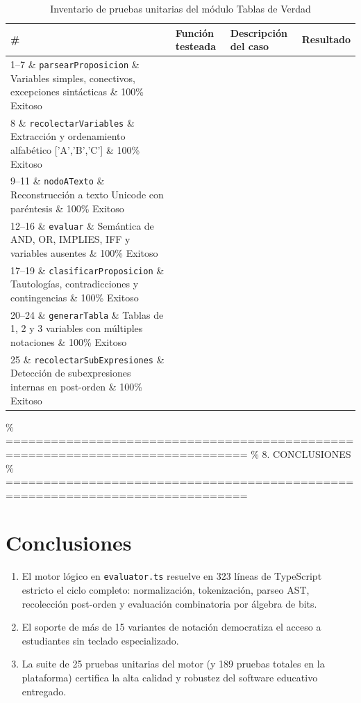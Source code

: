 \documentclass[11pt,a4paper]{article}
\begin{document}
\begin{table}[H]
\centering
\caption{Inventario de pruebas unitarias del módulo Tablas de Verdad}
\label{tab:inventario_tests}
\small
\begin{tabularx}{\textwidth}{llXl}
\toprule
\textbf{\#} & \textbf{Función testeada} & \textbf{Descripción del caso} & \textbf{Resultado} \\
\midrule
1--7 \& \texttt{parsearProposicion} \& Variables simples, conectivos, excepciones sintácticas \& 100\% Exitoso \\
8 \& \texttt{recolectarVariables} \& Extracción y ordenamiento alfabético ['A','B','C'] \& 100\% Exitoso \\
9--11 \& \texttt{nodoATexto} \& Reconstrucción a texto Unicode con paréntesis \& 100\% Exitoso \\
12--16 \& \texttt{evaluar} \& Semántica de AND, OR, IMPLIES, IFF y variables ausentes \& 100\% Exitoso \\
17--19 \& \texttt{clasificarProposicion} \& Tautologías, contradicciones y contingencias \& 100\% Exitoso \\
20--24 \& \texttt{generarTabla} \& Tablas de 1, 2 y 3 variables con múltiples notaciones \& 100\% Exitoso \\
25 \& \texttt{recolectarSubExpresiones} \& Detección de subexpresiones internas en post-orden \& 100\% Exitoso \\
\bottomrule
\end{tabularx}
\end{table}

\% ==============================================================================
\% 8. CONCLUSIONES
\% ==============================================================================
\section{Conclusiones}

\begin{enumerate}[label=\arabic*.]
  \item El motor lógico en \texttt{evaluator.ts} resuelve en 323 líneas de TypeScript estricto el ciclo completo: normalización, tokenización, parseo AST, recolección post-orden y evaluación combinatoria por álgebra de bits.
  \item El soporte de más de 15 variantes de notación democratiza el acceso a estudiantes sin teclado especializado.
  \item La suite de 25 pruebas unitarias del motor (y 189 pruebas totales en la plataforma) certifica la alta calidad y robustez del software educativo entregado.
\end{enumerate}
\end{document}
